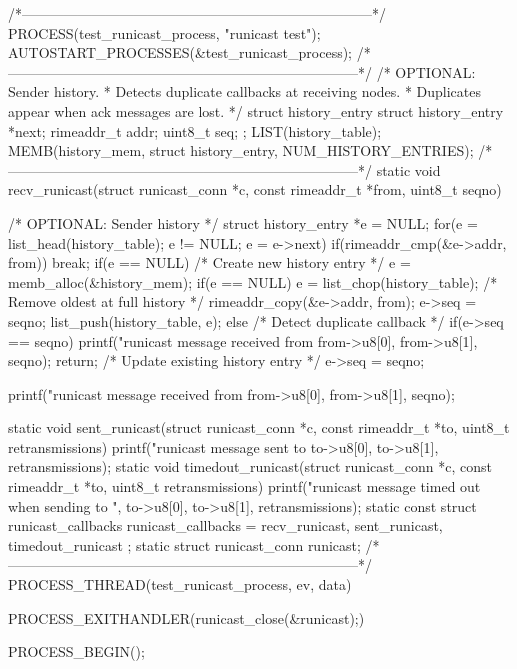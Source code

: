 \begin{DoxyCodeInclude}
/*---------------------------------------------------------------------------*/
PROCESS(test_runicast_process, "runicast test");
AUTOSTART_PROCESSES(&test_runicast_process);
/*---------------------------------------------------------------------------*/
/* OPTIONAL: Sender history.
 * Detects duplicate callbacks at receiving nodes.
 * Duplicates appear when ack messages are lost. */
struct history_entry {
  struct history_entry *next;
  rimeaddr_t addr;
  uint8_t seq;
};
LIST(history_table);
MEMB(history_mem, struct history_entry, NUM_HISTORY_ENTRIES);
/*---------------------------------------------------------------------------*/
static void
recv_runicast(struct runicast_conn *c, const rimeaddr_t *from, uint8_t seqno)
{
  /* OPTIONAL: Sender history */
  struct history_entry *e = NULL;
  for(e = list_head(history_table); e != NULL; e = e->next) {
    if(rimeaddr_cmp(&e->addr, from)) {
      break;
    }
  }
  if(e == NULL) {
    /* Create new history entry */
    e = memb_alloc(&history_mem);
    if(e == NULL) {
      e = list_chop(history_table); /* Remove oldest at full history */
    }
    rimeaddr_copy(&e->addr, from);
    e->seq = seqno;
    list_push(history_table, e);
  } else {
    /* Detect duplicate callback */
    if(e->seq == seqno) {
      printf("runicast message received from %
             from->u8[0], from->u8[1], seqno);
      return;
    }
    /* Update existing history entry */
    e->seq = seqno;
  }

  printf("runicast message received from %
         from->u8[0], from->u8[1], seqno);
}
static void
sent_runicast(struct runicast_conn *c, const rimeaddr_t *to, uint8_t 
      retransmissions)
{
  printf("runicast message sent to %
         to->u8[0], to->u8[1], retransmissions);
}
static void
timedout_runicast(struct runicast_conn *c, const rimeaddr_t *to, uint8_t 
      retransmissions)
{
  printf("runicast message timed out when sending to %
      \n",
         to->u8[0], to->u8[1], retransmissions);
}
static const struct runicast_callbacks runicast_callbacks = {recv_runicast,
                                                             sent_runicast,
                                                             timedout_runicast}
      ;
static struct runicast_conn runicast;
/*---------------------------------------------------------------------------*/
PROCESS_THREAD(test_runicast_process, ev, data)
{
  PROCESS_EXITHANDLER(runicast_close(&runicast);)

  PROCESS_BEGIN();

}
\end{DoxyCodeInclude}
